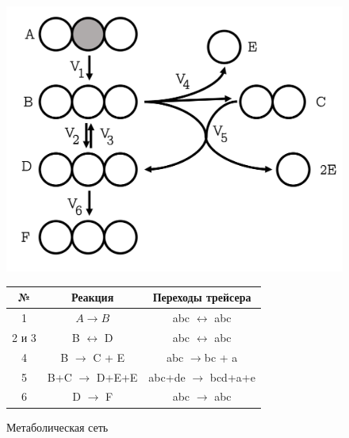 \documentclass[14pt, a4paper]{extreport}
\begin{document}
\begin{figure}[b]
	\centering
	\begin{minipage}[l]{.5\textwidth}
		\centering
		\includegraphics[scale=0.1]{full_emu_map.png}
		\caption{Метаболическая сеть}
		\label{emu_example}
	\end{minipage}%
	\begin{minipage}[r]{.5\textwidth}
		\centering
		\small
		\begin{tabular}{c c c}
			\hline
			№ & Реакция & Переходы трейсера\\
			\hline
			1 & $A \to B$ & abc $\leftrightarrow$ abc\\
			2 и 3 & B $\leftrightarrow$ D & abc $\leftrightarrow$ abc\\
			4 & B $\to$ C + E & abc $\to$bc + a\\
			5 & B+C $\to$ D+E+E & abc+de $\to$ bcd+a+e\\
			6 & D $\to$ F & abc $\to$ abc\\
			\hline
		\end{tabular}
		\label{emu_example_table}
	\end{minipage}
\end{figure}
\end{document}
